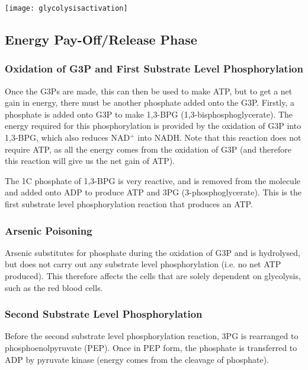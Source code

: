 \begin{center}
\texttt{[image: glycolysisactivation]}
\end{center}

\subsection{Energy Pay-Off/Release Phase}

\subsubsection{Oxidation of G3P and First Substrate Level Phosphorylation}

Once the G3Ps are made, this can then be used to make ATP, but to get a net gain in energy, there must be another phosphate added onto the G3P.
Firstly, a phosphate is added onto G3P to make 1,3-BPG (1,3-bisphosphoglycerate).
The energy required for this phosphorylation is provided by the oxidation of G3P into 1,3-BPG, which also reduces NAD$^+$ into NADH.
Note that this reaction does not require ATP, as all the energy comes from the oxidation of G3P (and therefore this reaction will give us the net gain of ATP).

The 1C phosphate of 1,3-BPG is very reactive, and is removed from the molecule and added onto ADP to produce ATP and 3PG (3-phosphoglycerate).
This is the first substrate level phosphorylation reaction that produces an ATP.

\subsubsection{Arsenic Poisoning}

Arsenic substitutes for phosphate during the oxidation of G3P and is hydrolysed, but does not carry out any substrate level phosphorylation (i.e. no net ATP produced).
This therefore affects the cells that are solely dependent on glycolysis, such as the red blood cells.

\subsubsection{Second Substrate Level Phosphorylation}

Before the second substrate level phosphorylation reaction, 3PG is rearranged to phosphoenolpyruvate (PEP).
Once in PEP form, the phosphate is transferred to ADP by pyruvate kinase (energy comes from the cleavage of phosphate).

